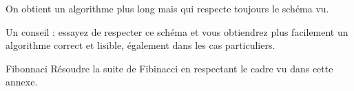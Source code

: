 On obtient un algorithme plus long 
mais qui respecte toujours le schéma vu.

Un conseil : essayez de respecter ce schéma 
et vous obtiendrez plus facilement un algorithme
correct et lisible, également dans les cas particuliers.

\begin{Exercice}{Fibonnaci} 
	Résoudre la suite de Fibinacci en respectant le cadre vu dans cette annexe.
\end{Exercice}
